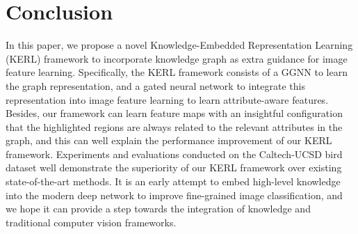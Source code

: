 \documentclass{article}
\begin{document}
\section{Conclusion}
In this paper, we propose a novel Knowledge-Embedded Representation Learning (KERL) framework to incorporate knowledge graph as extra guidance for image feature learning. Specifically, the KERL framework consists of a GGNN to learn the graph representation, and a gated neural network to integrate this representation into image feature learning to learn attribute-aware features. Besides, our framework can learn feature maps with an insightful configuration that the highlighted regions are always related to the relevant attributes in the graph, and this can well explain the performance improvement of our KERL framework. Experiments and evaluations conducted on the Caltech-UCSD bird dataset well demonstrate the superiority of our KERL framework over existing state-of-the-art methods. It is an early attempt to embed high-level knowledge into the modern deep network to improve fine-grained image classification, and we hope it can provide a step towards the integration of knowledge and traditional computer vision frameworks.


\small


\end{document}
